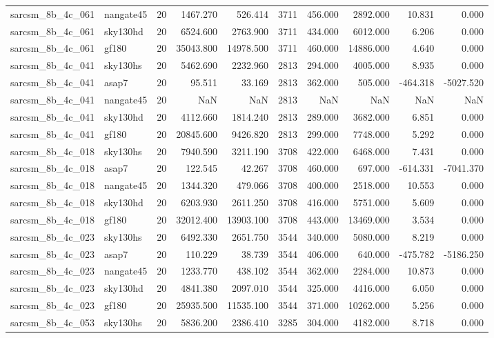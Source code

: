 \begin{tabular}{llrrrrrrrr}
sarcsm\_8b\_4c\_061 & nangate45 & 20 & 1467.270 & 526.414 & 3711 & 456.000 & 2892.000 & 10.831 & 0.000 \\
sarcsm\_8b\_4c\_061 & sky130hd & 20 & 6524.600 & 2763.900 & 3711 & 434.000 & 6012.000 & 6.206 & 0.000 \\
sarcsm\_8b\_4c\_061 & gf180 & 20 & 35043.800 & 14978.500 & 3711 & 460.000 & 14886.000 & 4.640 & 0.000 \\
sarcsm\_8b\_4c\_041 & sky130hs & 20 & 5462.690 & 2232.960 & 2813 & 294.000 & 4005.000 & 8.935 & 0.000 \\
sarcsm\_8b\_4c\_041 & asap7 & 20 & 95.511 & 33.169 & 2813 & 362.000 & 505.000 & -464.318 & -5027.520 \\
sarcsm\_8b\_4c\_041 & nangate45 & 20 & NaN & NaN & 2813 & NaN & NaN & NaN & NaN \\
sarcsm\_8b\_4c\_041 & sky130hd & 20 & 4112.660 & 1814.240 & 2813 & 289.000 & 3682.000 & 6.851 & 0.000 \\
sarcsm\_8b\_4c\_041 & gf180 & 20 & 20845.600 & 9426.820 & 2813 & 299.000 & 7748.000 & 5.292 & 0.000 \\
sarcsm\_8b\_4c\_018 & sky130hs & 20 & 7940.590 & 3211.190 & 3708 & 422.000 & 6468.000 & 7.431 & 0.000 \\
sarcsm\_8b\_4c\_018 & asap7 & 20 & 122.545 & 42.267 & 3708 & 460.000 & 697.000 & -614.331 & -7041.370 \\
sarcsm\_8b\_4c\_018 & nangate45 & 20 & 1344.320 & 479.066 & 3708 & 400.000 & 2518.000 & 10.553 & 0.000 \\
sarcsm\_8b\_4c\_018 & sky130hd & 20 & 6203.930 & 2611.250 & 3708 & 416.000 & 5751.000 & 5.609 & 0.000 \\
sarcsm\_8b\_4c\_018 & gf180 & 20 & 32012.400 & 13903.100 & 3708 & 443.000 & 13469.000 & 3.534 & 0.000 \\
sarcsm\_8b\_4c\_023 & sky130hs & 20 & 6492.330 & 2651.750 & 3544 & 340.000 & 5080.000 & 8.219 & 0.000 \\
sarcsm\_8b\_4c\_023 & asap7 & 20 & 110.229 & 38.739 & 3544 & 406.000 & 640.000 & -475.782 & -5186.250 \\
sarcsm\_8b\_4c\_023 & nangate45 & 20 & 1233.770 & 438.102 & 3544 & 362.000 & 2284.000 & 10.873 & 0.000 \\
sarcsm\_8b\_4c\_023 & sky130hd & 20 & 4841.380 & 2097.010 & 3544 & 325.000 & 4416.000 & 6.050 & 0.000 \\
sarcsm\_8b\_4c\_023 & gf180 & 20 & 25935.500 & 11535.100 & 3544 & 371.000 & 10262.000 & 5.256 & 0.000 \\
sarcsm\_8b\_4c\_053 & sky130hs & 20 & 5836.200 & 2386.410 & 3285 & 304.000 & 4182.000 & 8.718 & 0.000 \\

\end{tabular}
